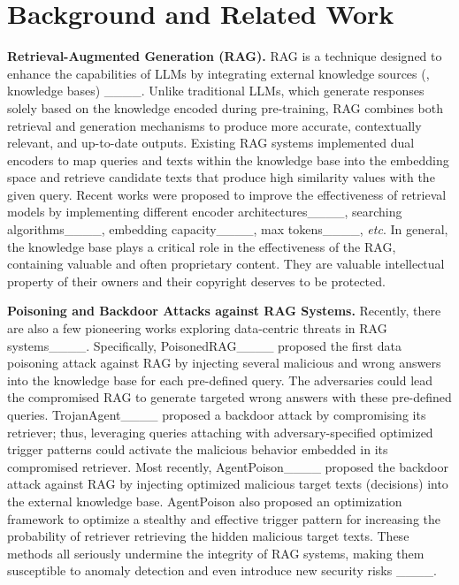 \section{Background and Related Work}
\noindent \textbf{Retrieval-Augmented Generation (RAG).} RAG is a technique designed to enhance the capabilities of LLMs by integrating external knowledge sources (\ie, knowledge bases) ____. Unlike traditional LLMs, which generate responses solely based on the knowledge encoded during pre-training, RAG combines both retrieval and generation mechanisms to produce more accurate, contextually relevant, and up-to-date outputs. Existing RAG systems implemented dual encoders to map queries and texts within the knowledge base into the embedding space and retrieve candidate texts that produce high similarity values with the given query. Recent works were proposed to improve the effectiveness of retrieval models by implementing different encoder architectures____, searching algorithms____, embedding capacity____, max tokens____, \textit{etc}. In general, the knowledge base plays a critical role in the effectiveness of the RAG, containing valuable and often proprietary content. They are valuable intellectual property of their owners and their copyright deserves to be protected. 






\noindent \textbf{Poisoning and Backdoor Attacks against RAG Systems.} Recently, there are also a few pioneering works exploring data-centric threats in RAG systems____. Specifically, PoisonedRAG____ proposed the first data poisoning attack against RAG by injecting several malicious and wrong answers into the knowledge base for each pre-defined query. The adversaries could lead the compromised RAG to generate targeted wrong answers with these pre-defined queries. TrojanAgent____ proposed a backdoor attack by compromising its retriever; thus, leveraging queries attaching with adversary-specified optimized trigger patterns could activate the malicious behavior embedded in its compromised retriever. Most recently, AgentPoison____ proposed the backdoor attack against RAG by injecting optimized malicious target texts (decisions) into the external knowledge base. AgentPoison also proposed an optimization framework to optimize a stealthy and effective trigger pattern for increasing the probability of retriever retrieving the hidden malicious target texts. These methods all seriously undermine the integrity of RAG systems, making them susceptible to anomaly detection and even introduce new security risks ____.


